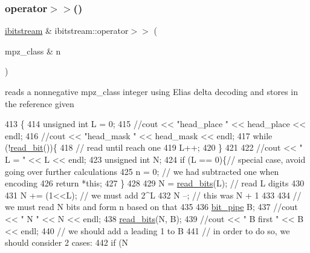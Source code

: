 \subsubsection{\texorpdfstring{operator$>$$>$()}{operator>>()}\hspace{0.1cm}{\footnotesize\ttfamily [2/2]}}
{\footnotesize\ttfamily \hyperlink{classibitstream}{ibitstream} \& ibitstream\+::operator$>$$>$ (\begin{DoxyParamCaption}\item[{mpz\+\_\+class \&}]{n }\end{DoxyParamCaption})}



reads a nonnegative mpz\+\_\+class integer using Elias delta decoding and stores in the reference given 


\begin{DoxyCode}
413                                                 \{
414   \textcolor{keywordtype}{unsigned} \textcolor{keywordtype}{int} L = 0;
415   \textcolor{comment}{//cout << "head\_place " << head\_place << endl;}
416   \textcolor{comment}{//cout << "head\_mask  " << head\_mask << endl;}
417   \textcolor{keywordflow}{while} (!\hyperlink{classibitstream_a895239acf7179f6778388c39c97643e4}{read\_bit}())\{
418     \textcolor{comment}{// read until reach one}
419     L++;
420   \}
421 
422   \textcolor{comment}{//cout << " L = " << L << endl;}
423   \textcolor{keywordtype}{unsigned} \textcolor{keywordtype}{int} N;
424   \textcolor{keywordflow}{if} (L == 0)\{\textcolor{comment}{// special case, avoid going over further calculations}
425     n = 0; \textcolor{comment}{// we had subtracted one when encoding }
426     \textcolor{keywordflow}{return} *\textcolor{keyword}{this};
427   \}
428 
429   N = \hyperlink{classibitstream_a2fdcaecf10fefa6942dcd5286a2696e0}{read\_bits}(L); \textcolor{comment}{// read L digits}
430   
431   N += (1<<L); \textcolor{comment}{// we must add 2^L}
432   N --; \textcolor{comment}{// this was N + 1}
433 
434   \textcolor{comment}{// we must read N bits and form n based on that}
435 
436   \hyperlink{classbit__pipe}{bit\_pipe} B;
437   \textcolor{comment}{//cout << " N " << N << endl;}
438   \hyperlink{classibitstream_a2fdcaecf10fefa6942dcd5286a2696e0}{read\_bits}(N, B);
439   \textcolor{comment}{//cout << " B first " << B << endl;}
440   \textcolor{comment}{// we should add a leading 1 to B}
441   \textcolor{comment}{// in order to do so, we should consider 2 cases:}
442   \textcolor{keywordflow}{if} (N %

\end{DoxyCode}
